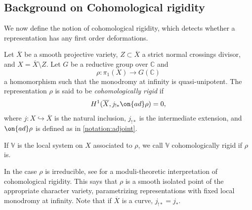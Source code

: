 \subsection{Background on Cohomological rigidity}
\label{subsection:background-rigidity}

We now define the notion of cohomological rigidity, which detects whether a
representation has any first order deformations.

\begin{definition}
\notready\label{definition:rigidity}
    Let $\overline{X}$ be a smooth projective variety, $Z\subset \overline{X}$ a
    strict normal crossings divisor, and $X=\overline{X}\setminus Z$. Let $G$ be
    a reductive group over $\mathbb{C}$ and $$\rho: \pi_1(X)\to G(\mathbb{C})$$
    a homomorphism such that the monodromy at infinity is quasi-unipotent.
     The representation $\rho$ is said to be \emph{cohomologically rigid} if
    $$H^1(\overline{X}, j_{!*}\on{ad}\rho)=0,$$ where $j: X\hookrightarrow
    \overline{X}$ is the natural inclusion, $j_{!*}$ is the intermediate
    extension, and $\on{ad}\rho$ is defined as in \autoref{notation:adjoint}.

    If $\mathbb{V}$ is the local system on $X$ associated to $\rho$, we call $\mathbb{V}$ cohomologically rigid if $\rho$ is.
\end{definition}
\begin{remark}
\notready
	\label{remark:}
	In the case $\rho$ is irreducible, see \cite[Proposition 4.7, Remark
    4.8]{klevdalP:g-rigid-local-systems-are-integral} for a moduli-theoretic
    interpretation of cohomological rigidity.
    This says that $\rho$ is a smooth isolated point of the appropriate character variety, parametrizing representations with {fixed} local monodromy at infinity. Note that if $\overline{X}$ is a curve, $j_{!*}=j_*.$
\end{remark}

